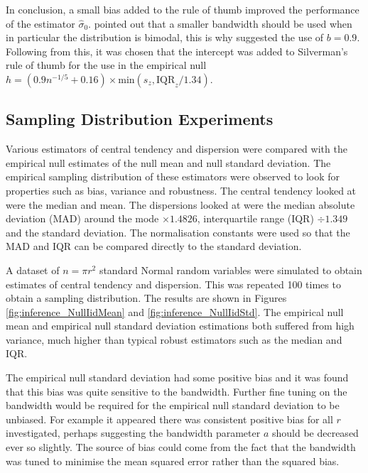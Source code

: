 In conclusion, a small bias added to the rule of thumb improved the performance of the estimator $\widehat{\sigma}_0$. \cite{silverman1986density} pointed out that a smaller bandwidth should be used when in particular the distribution is bimodal, this is why \cite{silverman1986density} suggested the use of $b=0.9$. Following from this, it was chosen that the intercept was added to Silverman's rule of thumb for the use in the empirical null $h = \left(0.9n^{-1/5}+ 0.16\right) \times\text{min}\left(s_z,\text{IQR}_z/1.34\right)$.

\afterpage{\clearpage}
\subsection{Sampling Distribution Experiments}

Various estimators of central tendency and dispersion were compared with the empirical null estimates of the null mean and null standard deviation. The empirical sampling distribution of these estimators were observed to look for properties such as bias, variance and robustness. The central tendency looked at were the median and mean. The dispersions looked at were the median absolute deviation (MAD) around the mode $\times 1.4826$, interquartile range (IQR) $\div 1.349$ and the standard deviation. The normalisation constants were used so that the MAD and IQR can be compared directly to the standard deviation.

A dataset of $n = \pi r^2$ standard Normal random variables were simulated to obtain estimates of central tendency and dispersion. This was repeated 100 times to obtain a sampling distribution. The results are shown in Figures \ref{fig:inference_NullIidMean} and \ref{fig:inference_NullIidStd}. The empirical null mean and empirical null standard deviation estimations both suffered from high variance, much higher than typical robust estimators such as the median and IQR.

The empirical null standard deviation had some positive bias and it was found that this bias was quite sensitive to the bandwidth. Further fine tuning on the bandwidth would be required for the empirical null standard deviation to be unbiased. For example it appeared there was consistent positive bias for all $r$ investigated, perhaps suggesting the bandwidth parameter $a$ should be decreased ever so slightly. The source of bias could come from the fact that the bandwidth was tuned to minimise the mean squared error rather than the squared bias.

